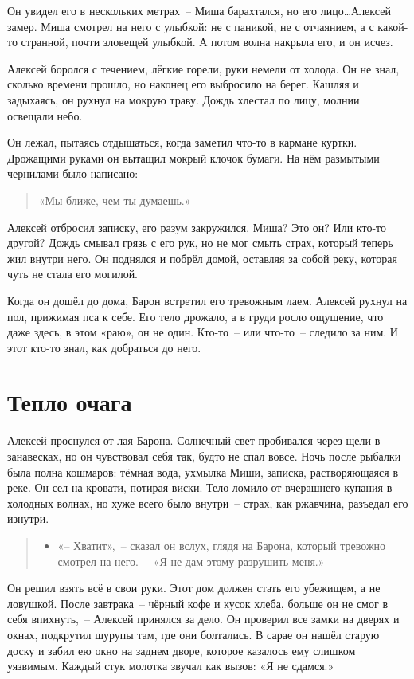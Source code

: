\documentclass[12pt,a4paper]{book}
\newenvironment{dialogue}{\begin{quote}\itshape\begin{itemize}\item[]}{\end{itemize}\end{quote}}
\begin{document}
Он увидел его в нескольких метрах~-- Миша барахтался, но его лицо\ldots Алексей замер. Миша смотрел на него с улыбкой: не с паникой, не с отчаянием, а с какой-то странной, почти зловещей улыбкой. А потом волна накрыла его, и он исчез.

Алексей боролся с течением, лёгкие горели, руки немели от холода. Он не знал, сколько времени прошло, но наконец его выбросило на берег. Кашляя и задыхаясь, он рухнул на мокрую траву. Дождь хлестал по лицу, молнии освещали небо.

Он лежал, пытаясь отдышаться, когда заметил что-то в кармане куртки. Дрожащими руками он вытащил мокрый клочок бумаги. На нём размытыми чернилами было написано:
\begin{quote}
«Мы ближе, чем ты думаешь.»
\end{quote}

Алексей отбросил записку, его разум закружился. Миша? Это он? Или кто-то другой? Дождь смывал грязь с его рук, но не мог смыть страх, который теперь жил внутри него. Он поднялся и побрёл домой, оставляя за собой реку, которая чуть не стала его могилой.

Когда он дошёл до дома, Барон встретил его тревожным лаем. Алексей рухнул на пол, прижимая пса к себе. Его тело дрожало, а в груди росло ощущение, что даже здесь, в этом «раю», он не один. Кто-то~-- или что-то~-- следило за ним. И этот кто-то знал, как добраться до него.

\chapter{Тепло очага}

Алексей проснулся от лая Барона. Солнечный свет пробивался через щели в занавесках, но он чувствовал себя так, будто не спал вовсе. Ночь после рыбалки была полна кошмаров: тёмная вода, ухмылка Миши, записка, растворяющаяся в реке. Он сел на кровати, потирая виски. Тело ломило от вчерашнего купания в холодных волнах, но хуже всего было внутри~-- страх, как ржавчина, разъедал его изнутри.

\begin{dialogue}
«-- Хватит»,~-- сказал он вслух, глядя на Барона, который тревожно смотрел на него.~-- «Я не дам этому разрушить меня.»
\end{dialogue}

Он решил взять всё в свои руки. Этот дом должен стать его убежищем, а не ловушкой. После завтрака~-- чёрный кофе и кусок хлеба, больше он не смог в себя впихнуть,~-- Алексей принялся за дело. Он проверил все замки на дверях и окнах, подкрутил шурупы там, где они болтались. В сарае он нашёл старую доску и забил ею окно на заднем дворе, которое казалось ему слишком уязвимым. Каждый стук молотка звучал как вызов: «Я не сдамся.»
\end{document}
